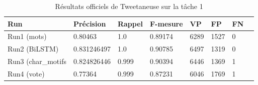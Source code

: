 \begin{table}
\begin{tabular}{l|l|l|l|l|l|l|l}
Run		& Précision	& Rappel& F-mesure	& VP 	&FP 	&FN\\
\hline
\hline
Run1 (mots)  	&0.80463   	& 1.0	& 0.89174 	&6289	&1527	&0\\
Run2 (BiLSTM)	& 0.831246497 	& 1.0	& 0.90785	&6497	&1319	&0\\
Run3 (char\_motifs&0.824826446  & 0.999	& 0.90394	&6446	&1369	&1\\
Run4 (vote)	&0.77364	& 0.999 & 0.87231	&6046	&1769	&1\\
\hline

\end{tabular}
\caption{Résultats officiels de Tweetaneuse sur la tâche 1}
\end{table}
